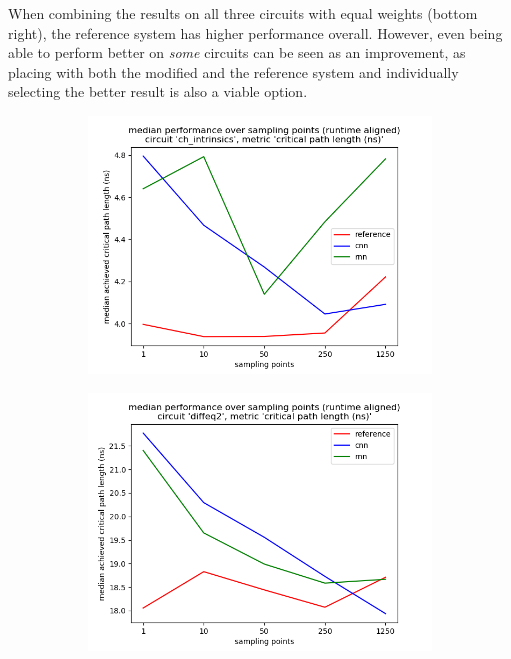 When combining the results on all three circuits with equal weights (bottom right), the reference system has higher performance overall. However, even being able to perform better on \textit{some} circuits can be seen as an improvement, as placing with both the modified and the reference system and individually selecting the better result is also a viable option.

\begin{figure}
	\centering
	\begin{subfigure}[b]{0.49\linewidth}
		\includegraphics[width=\linewidth]{plots/eval-ch_intrinsics-critical-path-median-full.png}
	\end{subfigure}
	\begin{subfigure}[b]{0.49\linewidth}
		\includegraphics[width=\linewidth]{plots/eval-diffeq2-critical-path-median-full.png}

\end{subfigure}
\end{figure}
